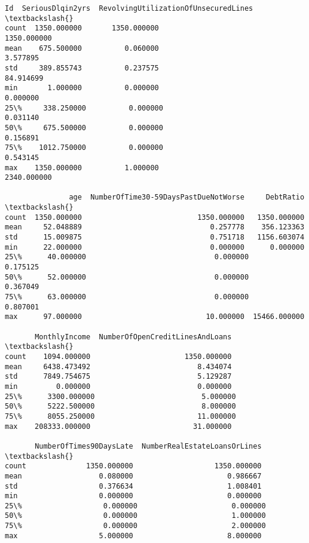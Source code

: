 \documentclass[11pt]{article}
\makeatletter
\newcommand{\boxspacing}{\kern\kvtcb@left@rule\kern\kvtcb@boxsep}
\newcommand{\prompt}[4]{
        {\ttfamily\llap{{\color{#2}[#3]:\hspace{3pt}#4}}\vspace{-\baselineskip}}
    }
\makeatother
\begin{document}
            \begin{tcolorbox}[breakable, size=fbox, boxrule=.5pt, pad at break*=1mm, opacityfill=0]
\prompt{Out}{outcolor}{3}{\boxspacing}
\begin{Verbatim}[commandchars=\\\{\}]
                Id  SeriousDlqin2yrs  RevolvingUtilizationOfUnsecuredLines  \textbackslash{}
count  1350.000000       1350.000000                           1350.000000
mean    675.500000          0.060000                              3.577895
std     389.855743          0.237575                             84.914699
min       1.000000          0.000000                              0.000000
25\%     338.250000          0.000000                              0.031140
50\%     675.500000          0.000000                              0.156891
75\%    1012.750000          0.000000                              0.543145
max    1350.000000          1.000000                           2340.000000

               age  NumberOfTime30-59DaysPastDueNotWorse     DebtRatio  \textbackslash{}
count  1350.000000                           1350.000000   1350.000000
mean     52.048889                              0.257778    356.123363
std      15.009875                              0.751718   1156.603074
min      22.000000                              0.000000      0.000000
25\%      40.000000                              0.000000      0.175125
50\%      52.000000                              0.000000      0.367049
75\%      63.000000                              0.000000      0.807001
max      97.000000                             10.000000  15466.000000

       MonthlyIncome  NumberOfOpenCreditLinesAndLoans  \textbackslash{}
count    1094.000000                      1350.000000
mean     6438.473492                         8.434074
std      7849.754675                         5.129287
min         0.000000                         0.000000
25\%      3300.000000                         5.000000
50\%      5222.500000                         8.000000
75\%      8055.250000                        11.000000
max    208333.000000                        31.000000

       NumberOfTimes90DaysLate  NumberRealEstateLoansOrLines  \textbackslash{}
count              1350.000000                   1350.000000
mean                  0.080000                      0.986667
std                   0.376634                      1.008401
min                   0.000000                      0.000000
25\%                   0.000000                      0.000000
50\%                   0.000000                      1.000000
75\%                   0.000000                      2.000000
max                   5.000000                      8.000000


\end{Verbatim}
\end{tcolorbox}
\end{document}
